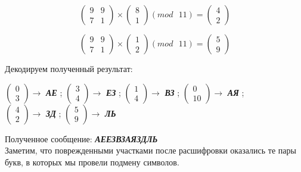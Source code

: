\documentclass[a5paper, 10pt]{article}
\theoremstyle{definition}
\theoremstyle{plain}
\theoremstyle{remark}
\begin{document}
\begin{equation}
\begin{pmatrix}
  9 & 9\\
 7 &  1
\end{pmatrix}
 \times
\begin{pmatrix}
 8\\
1
\end{pmatrix}
(mod \text{ }11)
= \begin{pmatrix}
4\\
2
\end{pmatrix}
\end{equation}


\begin{equation}
\begin{pmatrix}
 9 & 9\\
 7 &  1
\end{pmatrix}
 \times
\begin{pmatrix}
 1\\
2
\end{pmatrix}
(mod \text{ }11)
= \begin{pmatrix}
5\\
9
\end{pmatrix}
\end{equation}


Декодируем полученный результат:
\begin{center}
 $ \begin{pmatrix}
0\\
3
\end{pmatrix} \to$ \textbf{\textit{АЕ}} ;
 $ \begin{pmatrix}
3\\
4
\end{pmatrix} \to$ \textbf{\textit{ЕЗ}} ;
 $ \begin{pmatrix}
1\\
4
\end{pmatrix} \to$ \textbf{\textit{ВЗ}} ;
 $ \begin{pmatrix}
0\\
10
\end{pmatrix} \to$ \textbf{\textit{АЯ}} ; \\
 $ \begin{pmatrix}
4\\
2
\end{pmatrix} \to$ \textbf{\textit{ЗД}} ;
$\begin{pmatrix}
5\\
9
\end{pmatrix} \to$ \textbf{\textit{ЛЬ}}  \\
\end{center}
Полученное сообщение:  \textbf{\textit{\colorbox{red! 50}{АЕ}\colorbox{green! 50}{ЕЗ}\colorbox{red! 50}{ВЗ}\colorbox{green! 50}{АЯ}\colorbox{red! 50}{ЗД}\colorbox{green! 50}{ЛЬ}}}\\
Заметим, что поврежденными участками после расшифровки оказались те пары букв, в которых мы провели подмену символов.\\
\end{document}
